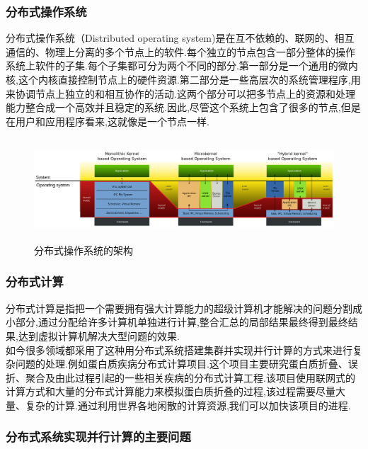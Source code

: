 \documentclass[paper=a4]{ctexart} %
\numberwithin{equation}{section} %
\numberwithin{figure}{section} %
\numberwithin{table}{section} %
\newcommand{\n}{\\\indent}
\begin{document}
\subsubsection{分布式操作系统}
分布式操作系统（Distributed operating system)是在互不依赖的、联网的、相互通信的、物理上分离的多个节点上的软件.每个独立的节点包含一部分整体的操作系统上软件的子集.每个子集都可分为两个不同的部分.第一部分是一个通用的微内核,这个内核直接控制节点上的硬件资源.第二部分是一些高层次的系统管理程序,用来协调节点上独立的和相互协作的活动.这两个部分可以把多节点上的资源和处理能力整合成一个高效并且稳定的系统.因此,尽管这个系统上包含了很多的节点,但是在用户和应用程序看来,这就像是一个节点一样.

\begin{figure}[htbp]
\centering
\includegraphics[width=4.8in,height=1.5in]{pic/1.png}
\caption{分布式操作系统的架构}
\end{figure}


\subsubsection{分布式计算}
分布式计算是指把一个需要拥有强大计算能力的超级计算机才能解决的问题分割成小部分,通过分配给许多计算机单独进行计算,整合汇总的局部结果最终得到最终结果,达到虚拟计算机解决大型问题的效果.\n
如今很多领域都采用了这种用分布式系统搭建集群并实现并行计算的方式来进行复杂问题的处理.例如蛋白质疾病分布式计算项目.这个项目主要研究蛋白质折叠、误折、聚合及由此过程引起的一些相关疾病的分布式计算工程.该项目使用联网式的计算方式和大量的分布式计算能力来模拟蛋白质折叠的过程,该过程需要尽量大量、复杂的计算.通过利用世界各地闲散的计算资源,我们可以加快该项目的进程.

\subsubsection{分布式系统实现并行计算的主要问题}
\end{document}
